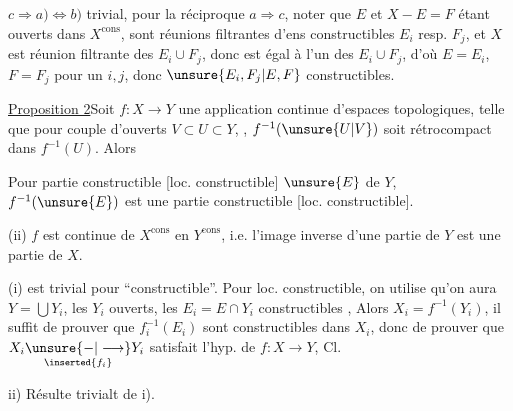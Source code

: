 $c\Longrightarrow a)\Longleftrightarrow b)$ trivial, pour la réciproque $a\Longrightarrow c$, noter que $E$ et $X-E=F$ étant ouverts dans $X^{\mathrm{cons}}$, sont réunions   filtrantes d'ens constructibles $E_i$ resp. $F_j$, et $X$ est réunion filtrante des $E_i\cup F_j$, donc est égal à l'un des $E_i\cup F_j$, d'où $E=E_i$,  $F=F_j$ pour un $i,j$, donc $\unsure{E_i,F_j|E,F}$ constructibles.

\uline{Proposition 2}\quad Soit $f:X\longrightarrow Y$ une application continue d'espaces topologiques, telle que  pour \unsure{$\forall$} couple d'ouverts $V\subset U\subset Y$, , $f^{-1}(\unsure{U|V})$ soit rétrocompact dans $f^{-1}(U)$. Alors



 Pour \unsure{$\forall$} partie constructible [loc. constructible]  $\unsure{E}$ de $Y$, $f^{-1}(\unsure{E})$ est une partie constructible [loc. constructible].

(ii) $f$ est continue de $X^{\mathrm{cons}}$ en $Y^{\mathrm{cons}}$, i.e. l'image inverse d'une partie   de $Y$ est une partie   de $X$.


 (i) est trivial pour ``constructible''. Pour loc. constructible, on utilise qu'on aura $Y=\bigcup Y_i$, les $Y_i$ ouverts, les $E_i=E\cap Y_i$ constructibles , Alors $X_i=f^{-1}(Y_i)$,  il suffit de prouver que $f_i^{-1}(E_i)$ sont constructibles dans $X_i$, donc de prouver que $X_i\underset{\inserted{f_i}}{\unsure{-|\longrightarrow}}Y_i$ satisfait l'hyp. de $f:X\longrightarrow Y$,  Cl.

ii) Résulte trivialt de i).

